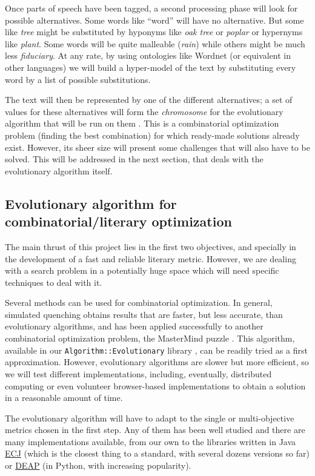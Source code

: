 \documentclass[a4paper,12pt,twocolumn]{article}
\begin{document}
Once parts of speech have been tagged, a second processing phase will
look for possible alternatives. Some words like ``word'' will have no
alternative. But some like {\em tree} might be substituted by hyponyms
like {\em oak tree} or {\em poplar} or hypernyms like {\em plant}.
Some words will be quite malleable ({\em rain}) while others might be
much less {\em fiduciary}. At any rate, by using ontologies like
Wordnet (or equivalent in other languages) we will build a hyper-model
of the text by substituting every word by a list of possible
substitutions.

The text will then be represented by one of the different
alternatives; a set of values for these alternatives will form the
{\em chromosome} for the evolutionary algorithm that will be run on
them \cite{eiben2002evolutionary}. This is a combinatorial
optimization problem (finding the best combination) for which
ready-made solutions already exist. However, its sheer size will
present some challenges that will also have to be solved. This will be
addressed in the next section, that deals with the evolutionary
algorithm itself.

\subsection{Evolutionary algorithm for combinatorial/literary optimization}

The main thrust of this project lies in the first two objectives, and
specially in the development of a fast and reliable literary
metric. However, we are dealing with a search problem in a potentially
huge space which will need specific techniques to deal with it.

Several methods can be used for combinatorial optimization. In
general, simulated quenching
\cite{DBLP:journals/apin/CastilloARMGLG12} obtains results that are
faster, but less accurate, than evolutionary algorithms, and has been
applied successfully to another combinatorial optimization problem,
the MasterMind puzzle \cite{jj-ppsn96}. This algorithm, available in
our {\tt Algorithm::Evolutionary} library \cite{ae09}, can be readily
tried as a first approximation. However, evolutionary algorithms are
slower but more efficient, so we will test different implementations,
including, eventually, distributed computing or even volunteer
browser-based implementations \cite{gecco07:workshop:dcor} to obtain
a solution in a reasonable amount of time. 

The evolutionary algorithm will have to adapt to the single or
multi-objective metrics chosen in the first step. Any of them has been
well studied and there are many implementations available, from our
own to the libraries written in Java \href{DBLP:conf/iwann/MereloRACML11}{ECJ} (which is the closest thing
to a standard, with several dozens versions so far) or \href{http://code.google.com/p/deap/}{DEAP} (in
Python, with increasing popularity). 
\end{document}
